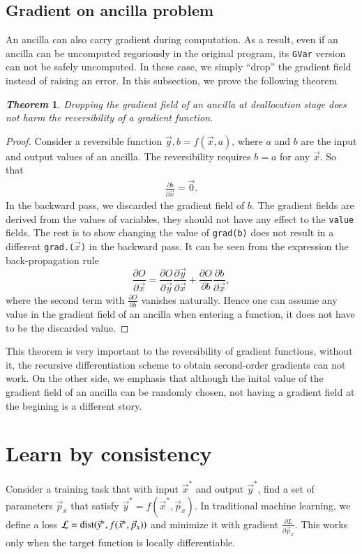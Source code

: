 \documentclass[aps,twocolumn,longbibliography,english,superscriptaddress]{revtex4-1}
\newcommand{\<}{\langle}
\renewcommand{\>}{\rangle}
\newcommand{\vx}{{\vec x}}
\newcommand{\vp}{{\vec p}}
\newcommand{\vy}{{\vec y}}
\newtheorem{theorem}{\textit{Theorem}}
\theoremstyle{definition}\newtheorem{definition}{\textit{Definition}}
\begin{document}
\subsection{Gradient on ancilla problem}
An ancilla can also carry gradient during computation. As a result, even if an ancilla can be uncomputed regoriously in the original program, its \texttt{GVar} version can not be safely uncomputed.
In these case, we simply ``drop'' the gradient field instead of raising an error. In this subsection, we prove the following theorem
\begin{theorem}
    Dropping the gradient field of an ancilla at deallocation stage does not harm the reversibility of a gradient function.
\end{theorem}
\begin{proof}
Consider a reversible function $\vy, b = f(\vx, a)$, where $a$ and $b$ are the input and output values of an ancilla. The reversibility requires $b=a$ for any $\vx$. So that
\begin{align}
    \frac{\partial b}{\partial \vx} = \vec 0.
\end{align}
In the backward pass, we discarded the gradient field of $b$.
The gradient fields are derived from the values of variables, they should not have any effect to the \texttt{value} fields.
The rest is to show changing the value of \texttt{grad(b)} does not result in a different \texttt{grad.($\vx$)} in the backward pass. It can be seen from the expression the back-propagation rule 
\begin{equation}
    \frac{\partial O}{\partial \vx} = \frac{\partial O}{\partial \vy}\frac{\partial \vy}{\partial \vx} + \frac{\partial O}{\partial b}\frac{\partial b}{\partial \vx},
\end{equation}
where the second term with $\frac{\partial O}{\partial{b}}$ vanishes naturally. Hence one can assume any value in the gradient field of an ancilla when entering a function, it does not have to be the discarded value.
\end{proof}
This theorem is very important to the reversibility of gradient functions, without it, the recursive differentiation scheme to obtain second-order gradients can not work.
On the other side, we emphasis that although the inital value of the gradient field of an ancilla can be randomly chosen, not having a gradient field at the begining is a different story.

\section{Learn by consistency}\label{sec:train}
Consider a training task that with input $\vx^*$ and output $\vy^*$,
find a set of parameters $\vp_x$ that satisfy $\vy^* = f(\vx^*, \vp_x)$.
In traditional machine learning, we define a loss $\mathcal{L} = {\rm dist}(\vy^*, f(\vx^*, \vp_x))$ and minimize it with gradient $\frac{\partial L}{\partial \vp_x}$. This works only when the target function is locally differentiable.
\end{document}
